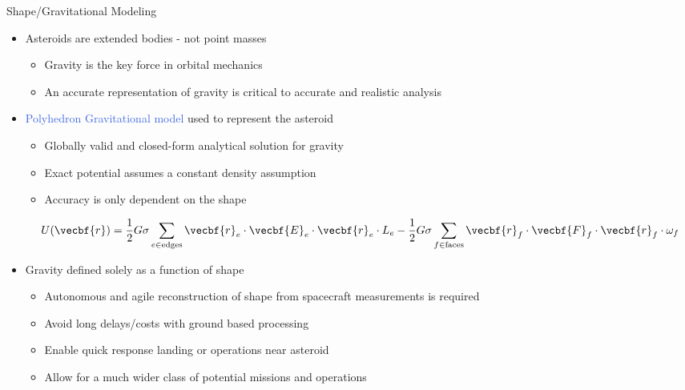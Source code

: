 \documentclass[final, usenames, dvipsnames]{beamer}
\newlength{\onecolwidth}
\def\Emph{\textcolor{RoyalBlue}}
\begin{document}
\begin{frame}[t]
\begin{columns}[T,onlytextwidth]
\begin{column}{\onecolwidth}
        \begin{block}{Shape/Gravitational Modeling}
            \begin{itemize}
                \item Asteroids are extended bodies - not point masses
                    \begin{itemize}
                        \item Gravity is the key force in orbital mechanics
                        \item An accurate representation of gravity is critical to accurate and realistic analysis
                    \end{itemize}
                \item \Emph{Polyhedron Gravitational model} used to represent the asteroid
                    \begin{itemize}
                        \item Globally valid and closed-form analytical solution for gravity
                        \item Exact potential assumes a constant density assumption
                        \item Accuracy is only dependent on the shape
                    \end{itemize}
                    \[
                        U(\vecbf{r}) = \frac{1}{2} G \sigma \sum_{e \in
                        \text{edges}} \vecbf{r}_e \cdot \vecbf{E}_e \cdot
                        \vecbf{r}_e \cdot L_e - \frac{1}{2}G \sigma \sum_{f \in
                        \text{faces}} \vecbf{r}_f \cdot \vecbf{F}_f \cdot
                        \vecbf{r}_f \cdot \omega_f 
                    \]	
                \item Gravity defined solely as a function of shape
                    \begin{itemize}
                        \item Autonomous and agile reconstruction of shape from spacecraft measurements is required
                        \item Avoid long delays/costs with ground based processing
                        \item Enable quick response landing or operations near asteroid 
                        \item Allow for a much wider class of potential missions and operations
                    \end{itemize}
            \end{itemize}
            \vspace*{0.25cm}
        \end{block} 
\end{column}  %


\end{columns}
\end{frame}
\end{document}
